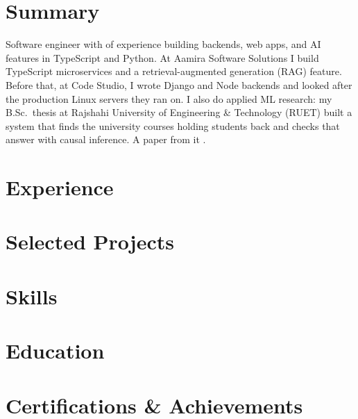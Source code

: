 \documentclass[10pt, a4paper]{article}
\begin{document}
\color{primary}
\cvheader

\section{Summary}
Software engineer with \factExpYears{} of experience building backends, web apps, and AI features in TypeScript and Python. At Aamira Software Solutions I build TypeScript microservices and a retrieval-augmented generation (RAG) feature. Before that, at Code Studio, I wrote Django and Node backends and looked after the production Linux servers they ran on. I also do applied ML research: my B.Sc.\ thesis at Rajshahi University of Engineering \& Technology (RUET) built a system that finds the university courses holding students back and checks that answer with causal inference. A paper from it \factLakIs{}.

\section{Experience}




\section{Selected Projects}



\section{Skills}


\section{Education}
\def\eduthesisline{}


\section{Certifications \& Achievements}
\def\certindustry{}

\end{document}
